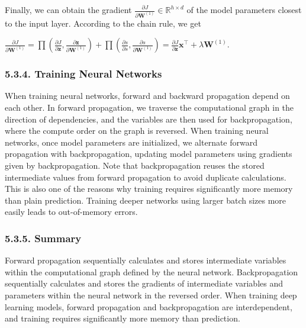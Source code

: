 \documentclass[11pt]{article}
\begin{document}
Finally, we can obtain the gradient
\(\frac{\partial J}{\partial \mathbf{W}^{(1)}} \in \mathbb{R}^{h \times d}\)
of the model parameters closest to the input layer. According to the
chain rule, we get

\(\frac{\partial J}{\partial \mathbf{W}^{(1)}} = \prod \left( \frac{\partial J}{\partial \mathbf{z}}, \frac{\partial \mathbf{z}}{\partial \mathbf{W}^{(1)}} \right) + \prod \left( \frac{\partial s}{\partial s}, \frac{\partial s}{\partial \mathbf{W}^{(1)}} \right) = \frac{\partial J}{\partial \mathbf{z}} \mathbf{x}^{\top} + \lambda \mathbf{W}^{(1)}\).

    \subsubsection*{5.3.4. Training Neural
Networks}\label{training-neural-networks}

    When training neural networks, forward and backward propagation depend
on each other. In forward propagation, we traverse the computational
graph in the direction of dependencies, and the variables are then used
for backpropagation, where the compute order on the graph is reversed.
When training neural networks, once model parameters are initialized, we
alternate forward propagation with backpropagation, updating model
parameters using gradients given by backpropagation. Note that
backpropagation reuses the stored intermediate values from forward
propagation to avoid duplicate calculations. This is also one of the
reasons why training requires significantly more memory than plain
prediction. Training deeper networks using larger batch sizes more
easily leads to out-of-memory errors.

    \subsubsection*{5.3.5. Summary}\label{summary}

    Forward propagation sequentially calculates and stores intermediate
variables within the computational graph defined by the neural network.
Backpropagation sequentially calculates and stores the gradients of
intermediate variables and parameters within the neural network in the
reversed order. When training deep learning models, forward propagation
and backpropagation are interdependent, and training requires
significantly more memory than prediction.


    
    
    
\end{document}
